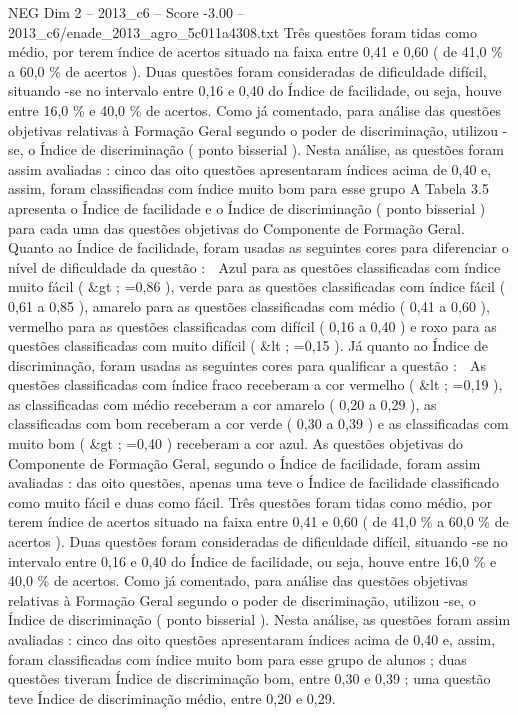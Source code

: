 \begin{textsample}{NEG Dim 2 – 2013\_c6 – Score -3.00 – 2013\_c6/enade\_2013\_agro\_5c011a4308.txt}
Três questões foram tidas como médio, por terem índice de acertos situado na faixa entre 0,41 e 0,60 ( de 41,0 \% a 60,0 \% de acertos ).
Duas questões foram consideradas de dificuldade difícil, situando -se no intervalo entre 0,16 e 0,40 do Índice de facilidade, ou seja, houve entre 16,0 \% e 40,0 \% de acertos.
Como já comentado, para análise das questões objetivas relativas à Formação Geral segundo o poder de discriminação, utilizou -se, o Índice de discriminação ( ponto bisserial ).
Nesta análise, as questões foram assim avaliadas : cinco das oito questões apresentaram índices acima de 0,40 e, assim, foram classificadas com índice muito bom para esse grupo A Tabela 3.5 apresenta o Índice de facilidade e o Índice de discriminação ( ponto bisserial ) para cada uma das questões objetivas do Componente de Formação Geral.
Quanto ao Índice de facilidade, foram usadas as seguintes cores para diferenciar o nível de dificuldade da questão :  Azul para as questões classificadas com índice muito fácil ( \&gt ; =0,86 ), verde para as questões classificadas com índice fácil ( 0,61 a 0,85 ), amarelo para as questões classificadas com médio ( 0,41 a 0,60 ), vermelho para as questões classificadas com difícil ( 0,16 a 0,40 ) e roxo para as questões classificadas com muito difícil ( \&lt ; =0,15 ).
Já quanto ao Índice de discriminação, foram usadas as seguintes cores para qualificar a questão :  As questões classificadas com índice fraco receberam a cor vermelho ( \&lt ; =0,19 ), as classificadas com médio receberam a cor amarelo ( 0,20 a 0,29 ), as classificadas com bom receberam a cor verde ( 0,30 a 0,39 ) e as classificadas com muito bom ( \&gt ; =0,40 ) receberam a cor azul.
As questões objetivas do Componente de Formação Geral, segundo o Índice de facilidade, foram assim avaliadas : das oito questões, apenas uma teve o Índice de facilidade classificado como muito fácil e duas como fácil.
Três questões foram tidas como médio, por terem índice de acertos situado na faixa entre 0,41 e 0,60 ( de 41,0 \% a 60,0 \% de acertos ).
Duas questões foram consideradas de dificuldade difícil, situando -se no intervalo entre 0,16 e 0,40 do Índice de facilidade, ou seja, houve entre 16,0 \% e 40,0 \% de acertos.
Como já comentado, para análise das questões objetivas relativas à Formação Geral segundo o poder de discriminação, utilizou -se, o Índice de discriminação ( ponto bisserial ).
Nesta análise, as questões foram assim avaliadas : cinco das oito questões apresentaram índices acima de 0,40 e, assim, foram classificadas com índice muito bom para esse grupo de alunos ; duas questões tiveram Índice de discriminação bom, entre 0,30 e 0,39 ; uma questão teve Índice de discriminação médio, entre 0,20 e 0,29.

\end{textsample}
